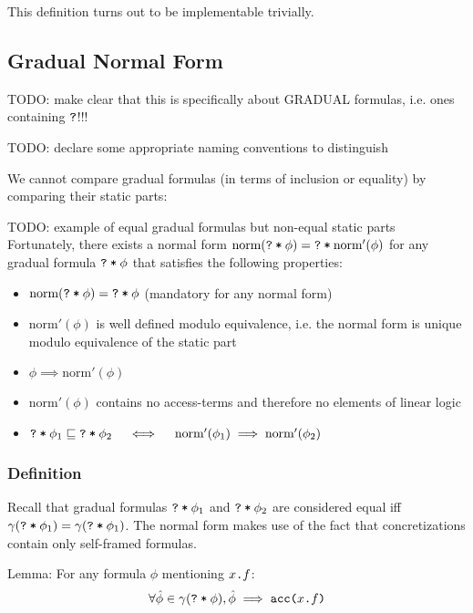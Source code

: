 \documentclass[11pt,a4paper]{article}
\begin{document}
This definition turns out to be implementable trivially.

\newcommand{\norm}{\textrm{norm}}
\newcommand{\snorm}{\norm'}
\subsection{Gradual Normal Form}
TODO: make clear that this is specifically about GRADUAL formulas, i.e. ones containing $\texttt{?}$!!!

TODO: declare some appropriate naming conventions to distinguish

We cannot compare gradual formulas (in terms of inclusion or equality) by comparing their static parts:

TODO: example of equal gradual formulas but non-equal static parts\\

Fortunately, there exists a normal form $\norm(\withqm{\phi}) = \withqm{\snorm(\phi)}$ for any gradual formula $\texttt{\texttt{?}\:*\:$\phi$}$ that satisfies the following properties:
\begin{itemize}
	\item $\norm(\withqm{\phi}) = \withqm{\phi}$ (mandatory for any normal form)
	\item $\snorm(\phi)$ is well defined modulo equivalence, i.e. the normal form is unique modulo equivalence of the static part
	\item $\phi \implies \snorm(\phi)$
	\item $\snorm(\phi)$ contains no access-terms and therefore no elements of linear logic
	\item $\withqm{\phi_1} \sqsubseteq \withqm{\phi_2}  \quad\iff\quad  \snorm(\phi_1) \implies \snorm(\phi_2)$
\end{itemize} 

\subsubsection{Definition}
Recall that gradual formulas $\texttt{\texttt{?}\:*\:$\phi_1$}$ and $\texttt{\texttt{?}\:*\:$\phi_2$}$ are considered equal iff $\gamma(\texttt{\texttt{?}\:*\:$\phi_1$}) = \gamma(\texttt{\texttt{?}\:*\:$\phi_1$})$.
The normal form makes use of the fact that concretizations contain only self-framed formulas.

Lemma:
For any formula $\phi$ mentioning $\texttt{$x$.$f$}$:
$$\forall \hat{\phi} \in \gamma(\texttt{\texttt{?}\:*\:$\phi$}), \hat{\phi} \implies \texttt{acc($x$.$f$)}$$
\end{document}
